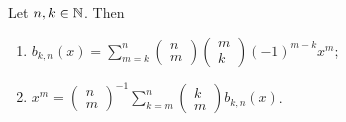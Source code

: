 \begin{proposition}
Let $n,k\in \mathbb{N}$. Then
\begin{enumerate}
\item $\displaystyle b_{k,n}(x) = \sum_{m=k}^n \begin{pmatrix}
n \\ m
\end{pmatrix}\begin{pmatrix}
m \\ k
\end{pmatrix}(-1)^{m-k}x^m$;
\item $\displaystyle x^m = \begin{pmatrix}
n \\ m
\end{pmatrix}^{-1}\sum_{k=m}^n \begin{pmatrix}
k \\ m
\end{pmatrix}b_{k,n}(x)$.
\end{enumerate}
\end{proposition}
